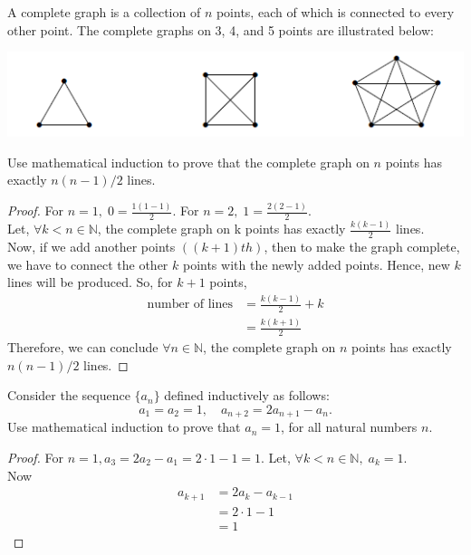 \documentclass[12pt]{article}
\newenvironment{problem}[2][Problem]{\begin{trivlist}
\item[\hskip \labelsep {\bfseries #1}\hskip \labelsep {\bfseries #2.}]}{\end{trivlist}}
\begin{document}
\begin{problem}{10}
A complete graph is a collection of \( n \) points, each of which is connected to every
other point. The complete graphs on 3, 4, and 5 points are illustrated below:\\
\begin{center}
    \includegraphics[width=0.5\linewidth]{image.png}
\end{center}
Use mathematical induction to prove that the complete graph on \( n \) points has exactly $n(n-1)/2$ lines.

\end{problem}

\begin{proof}
For $n = 1, \; 0 = \frac{1(1-1)}{2}$. For $n = 2, \; 1 = \frac{2(2-1)}{2}$. \\
Let, $\forall k < n \in \mathbb{N}$, the complete graph on k points has exactly $\frac{k(k-1)}{2}$ lines. \\
Now, if we add another points $((k+1)th)$, then to make the graph complete, we have to connect the other $k$ points with the newly added points. Hence, new $k$ lines will be produced.
So, for $k + 1$ points, 
\begin{align*}
\text{number of lines} & = \frac{k(k-1)}{2} + k \\
& = \frac{k(k+1)}{2}
\end{align*}
Therefore, we can conclude $\forall n \in \mathbb{N}$, the complete graph on $n$ points has exactly $n(n-1)/2$ lines.

\end{proof}

\begin{problem}{11}
Consider the sequence \( \{a_n\} \) defined inductively as follows:
\[
a_1 = a_2 = 1, \quad a_{n+2} = 2a_{n+1} - a_n.
\]
Use mathematical induction to prove that \( a_n = 1 \), for all natural numbers \( n \).

\end{problem}

\begin{proof}
For $n = 1, a_3 = 2a_2 - a_1 = 2\cdot 1 - 1 = 1$. Let, $\forall k < n \in \mathbb{N}, \; a_k = 1$.\\
Now
\begin{align*}
a_{k+1} & = 2a_k - a_{k-1} \\
& = 2\cdot 1 - 1 \\
& = 1
\end{align*}

\end{proof}
\end{document}
